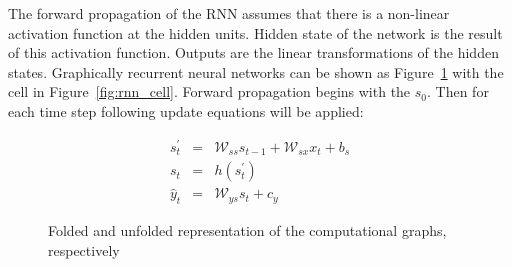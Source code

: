 The forward propagation of the RNN assumes that there is a non-linear activation function at the hidden units. Hidden state of the network is the result of this activation function. 
Outputs are the linear transformations of the hidden states. 
Graphically recurrent neural networks can be shown as Figure~\ref{fig:rnn} with the cell in Figure~\ref{fig:rnn_cell}.
Forward propagation begins with the $s_0$. Then for each time step following update equations will be applied:

\begin{eqnarray}
     s^{\prime}_{t} &=& \mathcal{W}_{ss}s_{t-1} + \mathcal{W}_{sx}x_t + b_s\\ 
     s_{t} &=& h \left(s^{\prime}_{t}\right) \\ 
     \hat{y}_{t} &=& \mathcal{W}_{ys}s_t + c_y
\end{eqnarray}

\begin{figure}
    \centering
  \hfill
    \caption{Folded and unfolded representation of the computational graphs, respectively}
    \label{fig:rnn}
\end{figure}

